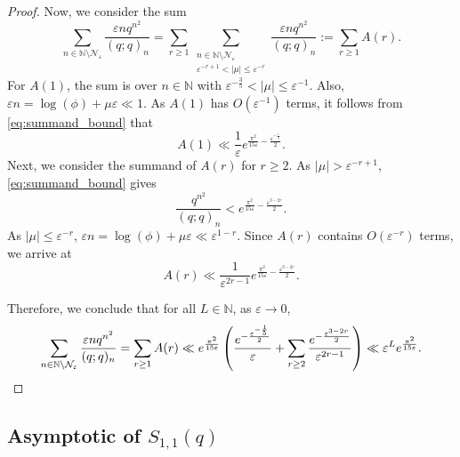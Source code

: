 \documentclass[11pt,reqno]{amsart}
\theoremstyle{remark}
\numberwithin{equation}{section}
\begin{document}
\begin{proof}
Now, we consider the sum
\[
	 \sum_{n \in \mathbb{N} \setminus \mathcal{N}_{\varepsilon}}  \frac{\varepsilon nq^{n^2}}{(q;q)_n} = \sum_{r\geq 1}\sum_{\substack{n \in \mathbb{N} \setminus \mathcal{N}_{\varepsilon}\\ \varepsilon^{-r+1}<|\mu|\leq \varepsilon^{-r}}} \frac{\varepsilon n q^{n^2}}{(q;q)_n} := \sum_{r\geq 1} A(r).
\]
For $A(1)$, the sum is over $n \in \mathbb{N}$ with $\varepsilon^{-\frac35}<|\mu|\leq \varepsilon^{-1}$. Also, $\varepsilon n=\log(\phi)+\mu \varepsilon \ll 1$. As $A(1)$ has $O(\varepsilon^{-1})$ terms, it follows from \eqref{eq:summand_bound} that
\[
	A(1) \ll \frac{1}{\varepsilon}e^{\frac{\pi^2}{15\varepsilon} -\frac{\varepsilon^{-\frac15}}{2}}.
\]
Next, we consider the summand of $A(r)$ for $r\geq 2$. As $|\mu|>\varepsilon^{-r+1}$, \eqref{eq:summand_bound} gives
\[
	\frac{q^{n^2}}{(q;q)_n} < e^{\frac{\pi^2}{15\varepsilon} -\frac{\varepsilon^{3-2r}}{2}}.
\]
As $|\mu|\leq \varepsilon^{-r}$,  $\varepsilon n=\log(\phi)+\mu \varepsilon \ll \varepsilon^{1-r}$. Since $A(r)$ contains $O(\varepsilon^{-r})$ terms, we arrive at
\[
	A(r) \ll \frac{1}{\varepsilon^{2r-1}}e^{\frac{\pi^2}{15\varepsilon} -\frac{\varepsilon^{3-2r}}{2}}.
\]

Therefore, we conclude that for all $L \in \mathbb{N}$, as $\varepsilon \to 0$,
\[
	\sum_{n \in \mathbb{N} \setminus \mathcal{N}_{\varepsilon}}  \frac{\varepsilon nq^{n^2}}{(q;q)_n} = \sum_{r\geq 1} A(r) \ll e^{\frac{\pi^2}{15\varepsilon}} \left( \frac{e^{ -\frac{\varepsilon^{-\frac15}}{2}}}{\varepsilon}+ \sum_{r\geq 2} \frac{e^{-\frac{\varepsilon^{3-2r}}{2}}}{\varepsilon^{2r-1}} \right) \ll \varepsilon^L e^{\frac{\pi^2}{15\varepsilon}}. \qedhere
\]
\end{proof}




\subsection{Asymptotic of $S_{1,1}(q)$}\label{sec:S_asymp}
\end{document}
